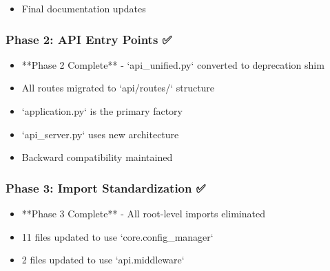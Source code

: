 \documentclass[11pt,a4paper]{article}
\begin{document}
\begin{itemize}
\item [ ] Final documentation updates
\end{itemize}

\subsubsection{Phase 2: API Entry Points ✅}

\begin{itemize}
\item [x] **Phase 2 Complete** - `api_unified.py` converted to deprecation shim
\end{itemize}

\begin{itemize}
\item [x] All routes migrated to `api/routes/` structure
\end{itemize}

\begin{itemize}
\item [x] `application.py` is the primary factory
\end{itemize}

\begin{itemize}
\item [x] `api_server.py` uses new architecture
\end{itemize}

\begin{itemize}
\item [x] Backward compatibility maintained
\end{itemize}

\subsubsection{Phase 3: Import Standardization ✅}

\begin{itemize}
\item [x] **Phase 3 Complete** - All root-level imports eliminated
\end{itemize}

\begin{itemize}
\item [x] 11 files updated to use `core.config_manager`
\end{itemize}

\begin{itemize}
\item [x] 2 files updated to use `api.middleware`
\end{itemize}
\end{document}
